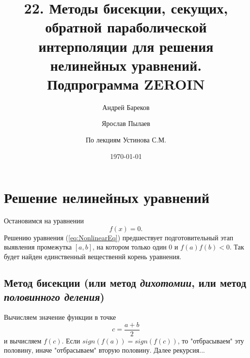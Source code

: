 \documentclass[a4paper,11pt]{article}
\title{22. Методы бисекции, секущих, обратной параболической интерполяции для решения
       нелинейных уравнений. Подпрограмма ZEROIN}
\author{Андрей Бареков \and Ярослав Пылаев \and По лекциям Устинова С.М.}
\date{\today}
\begin{document}
\maketitle
\newpage

\section{Решение нелинейных уравнений}
Остановимся на уравнении
\begin{equation}
  f(x) = 0.
  \label{eq:NonlinearEq}
\end{equation}
Решению уравнения (\ref{eq:NonlinearEq}) предшествует подготовительный этап выявления промежутка $[a, b]$, на котором только один $0$
и $f(a)f(b) < 0$. Так будет найден единственный вещественнй корень уравнения.

\subsection{Метод бисекции (или метод \textit{дихотомии}, или метод \textit{половинного деления})}
\begin{center}
\end{center}
Вычисляем значение функции в точке \[c = \frac{a+b}{2}\] и вычисляем $f(c)$. Если $sign(f(a)) = sign(f(c))$, то "отбрасываем" эту половину, иначе "отбрасываем" вторую половину. Далее рекурсия...\\
\end{document}
